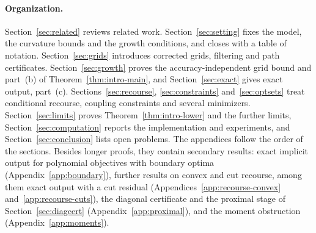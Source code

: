 \paragraph{Organization.}
Section~\ref{sec:related} reviews related work. Section~\ref{sec:setting}
fixes the model, the curvature bounds and the growth conditions, and closes
with a table of notation. Section~\ref{sec:grids} introduces corrected grids,
filtering and path certificates. Section~\ref{sec:growth} proves the
accuracy-independent grid bound and part~(b) of
Theorem~\ref{thm:intro-main}, and Section~\ref{sec:exact} gives exact output,
part~(c). Sections~\ref{sec:recourse}, \ref{sec:constraints}
and~\ref{sec:optsets} treat conditional recourse, coupling constraints and
several minimizers. Section~\ref{sec:limits} proves
Theorem~\ref{thm:intro-lower} and the further limits,
Section~\ref{sec:computation} reports the implementation and experiments, and
Section~\ref{sec:conclusion} lists open problems. The appendices follow the
order of the sections. Besides longer proofs, they contain secondary results:
exact implicit output for polynomial objectives with boundary optima
(Appendix~\ref{app:boundary}), further results on convex and cut recourse,
among them exact output with a cut residual
(Appendices~\ref{app:recourse-convex} and~\ref{app:recourse-cuts}), the
diagonal certificate and the proximal stage of Section~\ref{sec:diagcert}
(Appendix~\ref{app:proximal}), and the moment obstruction
(Appendix~\ref{app:moments}).
